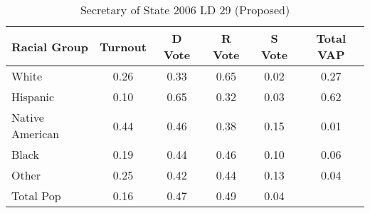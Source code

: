 \begin{table}[htb]
\begin{center}
\caption{Secretary of State 2006 LD 29 (Proposed)}
\label{sos06_vap_ld_29}
\begin{tabular}{lccccc}
  \hline
Racial Group & Turnout & D Vote & R Vote & S Vote & Total VAP \\ 
  \hline
White & 0.26 & 0.33 & 0.65 & 0.02 & 0.27 \\ 
  Hispanic & 0.10 & 0.65 & 0.32 & 0.03 & 0.62 \\ 
  Native American & 0.44 & 0.46 & 0.38 & 0.15 & 0.01 \\ 
  Black & 0.19 & 0.44 & 0.46 & 0.10 & 0.06 \\ 
  Other & 0.25 & 0.42 & 0.44 & 0.13 & 0.04 \\ 
  Total Pop & 0.16 & 0.47 & 0.49 & 0.04 &  \\ 
   \hline
\end{tabular}
\end{center}
\end{table}
